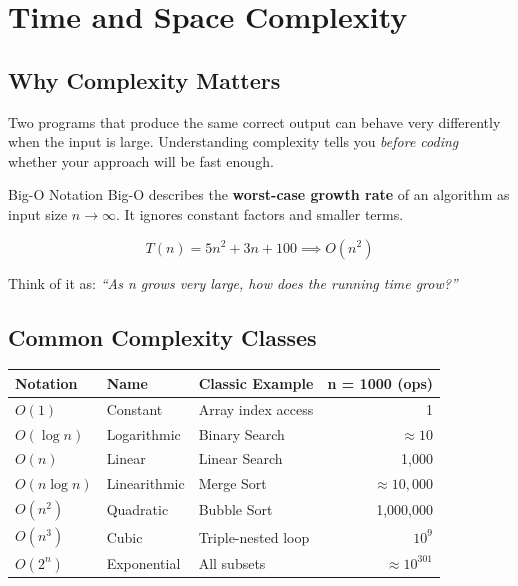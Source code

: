 \documentclass[12pt,a4paper,oneside]{book}
\begin{document}
\chapter{Time and Space Complexity}

\section{Why Complexity Matters}

Two programs that produce the same correct output can behave very differently when the input is large. Understanding complexity tells you \textit{before coding} whether your approach will be fast enough.

\begin{definitionbox}{Big-O Notation}
Big-O describes the \textbf{worst-case growth rate} of an algorithm as input size $n \to \infty$. It ignores constant factors and smaller terms.

$$T(n) = 5n^2 + 3n + 100 \implies O(n^2)$$

Think of it as: \textit{``As n grows very large, how does the running time grow?''}
\end{definitionbox}

\section{Common Complexity Classes}

\begin{center}
\begin{tabular}{lllr}
\toprule
\textbf{Notation} & \textbf{Name} & \textbf{Classic Example} & \textbf{n = 1000 (ops)}\\
\midrule
$O(1)$        & Constant     & Array index access    & 1\\
$O(\log n)$   & Logarithmic  & Binary Search         & $\approx 10$\\
$O(n)$        & Linear       & Linear Search         & 1,000\\
$O(n \log n)$ & Linearithmic & Merge Sort            & $\approx 10{,}000$\\
$O(n^2)$      & Quadratic    & Bubble Sort           & 1,000,000\\
$O(n^3)$      & Cubic        & Triple-nested loop    & $10^9$\\
$O(2^n)$      & Exponential  & All subsets           & $\approx 10^{301}$\\
\bottomrule
\end{tabular}
\end{center}
\end{document}
